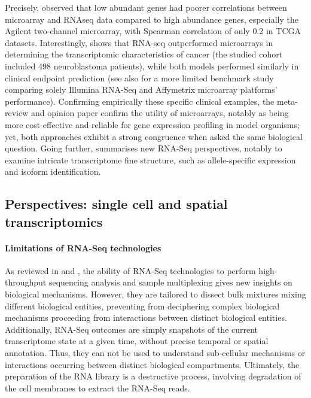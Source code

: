 Precisely, \autocite{guo_etal13} observed that low abundant genes had poorer correlations between microarray and RNAseq data compared to high abundance genes, especially the Agilent two-channel microarray, with Spearman correlation of only 0.2 in TCGA datasets. Interestingly, \autocite{zhang_etal15} shows that RNA-seq outperformed microarrays in determining the transcriptomic characteristics of cancer (the studied cohort included 498 neuroblastoma patients), while both models performed similarly in clinical endpoint prediction (see also  \autocite{xu_etal13} for a more limited benchmark study comparing solely Illumina RNA-Seq and Affymetrix microarray platforms' performance). Confirming empirically these specific clinical examples, the meta-review \autocite{malone_oliver11} and opinion paper \autocite{mantione_etal14} confirm the utility of microarrays, notably as being more cost-effective and reliable for gene expression profiling in model organisms; yet, both approaches exhibit a strong congruence when asked the same biological question. 
Going further,  summarises new RNA-Seq perspectives, notably to examine intricate transcriptome fine structure, such as allele-specific expression and isoform identification.

\subsection{Perspectives: single cell and spatial transcriptomics}
\label{subsec:single-cell-spatial-transcript}


\paragraph{Limitations of \acrshort{RNA-Seq} technologies}

As reviewed in  and , the ability of \acrshort{RNA-Seq} technologies to perform high-throughput sequencing analysis and sample multiplexing gives new insights on biological mechanisms. However, they are tailored to dissect bulk mixtures mixing different biological entities, preventing from deciphering complex biological mechanisms proceeding from interactions between distinct biological entities. Additionally, \acrshort{RNA-Seq} outcomes are simply snapshots of the current transcriptome state at a given time, without precise temporal or spatial annotation. Thus, they can not be used to understand sub-cellular mechanisms or interactions occurring between distinct biological compartments. Ultimately, the preparation of the RNA library is a destructive process, involving degradation of the cell membranes to extract the \acrshort{RNA-Seq} reads.


